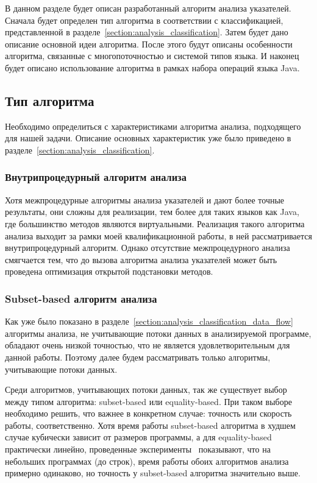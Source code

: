\documentclass[14pt,titlepage]{extarticle}
\newcommand{\num}[1]{\numprint{#1}}
\newcommand{\eng}[1]{{\English#1}}
\begin{document}
    В данном разделе будет описан разработанный алгоритм анализа указателей.
    Сначала будет определен тип алгоритма в соответствии с классификацией,
    представленной в разделе~\ref{section:analysis_classification}.
    Затем будет дано описание основной идеи алгоритма.
    После этого будут описаны особенности алгоритма, связанные с
    многопоточностью и системой типов языка.
    И наконец будет описано использование алгоритма в рамках набора операций
    языка Java.

    \subsection{Тип алгоритма}

      Необходимо определиться с характеристиками алгоритма анализа,
      подходящего для нашей задачи. Описание основных характеристик уже было
      приведено в разделе~\ref{section:analysis_classification}.

      \subsubsection{Внутрипроцедурный алгоритм анализа}

        Хотя межпроцедурные алгоритмы анализа указателей и дают более точные
        результаты, они сложны для реализации, тем более для таких
        языков как Java, где большинство методов являются виртуальными.
        Реализация такого алгоритма анализа выходит за рамки моей
        квалификационной работы, в ней рассматривается внутрипроцедурный
        алгоритм. Однако отсутствие межпроцедурного анализа смягчается тем, что
        до вызова алгоритма анализа указателей может быть проведена
        оптимизация открытой подстановки методов.

      \subsubsection{\eng{Subset-based} алгоритм анализа}

        Как уже было показано в
        разделе~\ref{section:analysis_classification_data_flow}
        алгоритмы анализа, не учитывающие потоки данных в анализируемой
        программе, обладают очень низкой точностью, что не является
        удовлетворительным для данной работы. Поэтому далее будем рассматривать
        только алгоритмы, учитывающие потоки данных.

        Среди алгоритмов, учитывающих потоки данных, так же существует выбор
        между типом алгоритма: \eng{subset-based} или \eng{equality-based}.
        При таком выборе необходимо решить, что важнее в конкретном
        случае: точность или скорость работы, соответственно.
        Хотя время работы \eng{subset-based} алгоритма в худшем случае
        кубически зависит от размеров программы, а для \eng{equality-based}
        практически линейно, проведенные
        эксперименты~\cite{shapiro_fast_and_accurate} показывают, что на
        небольших программах (до \num{3000} строк), время работы обоих
        алгоритмов анализа примерно одинаково, но точность у \eng{subset-based}
        алгоритма значительно выше.
\end{document}
